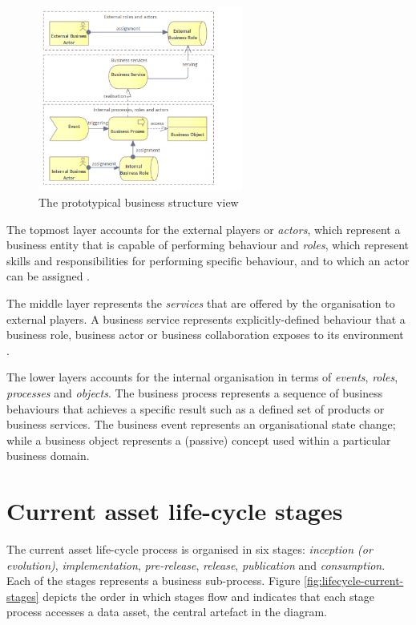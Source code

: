 	\begin{figure}[h]
		\centering
		\includegraphics[width=0.6\textwidth]{images/views/Business view.png}
		\caption{The prototypical business structure view}
		\label{fig:business-structure-protopypical}
	\end{figure} 
	
	The topmost layer accounts for the external players or \textit{actors}, which represent a business entity that is capable of performing behaviour and \textit{roles}, which represent skills and responsibilities for performing specific behaviour, and to which an actor can be assigned \citep{archimate3.1}. 
	
	The middle layer represents the \textit{services} that are offered by the organisation to external players. A business service represents explicitly-defined behaviour that a business role, business actor or business collaboration exposes to its environment \citep{archimate3.1}.
	
	The lower layers accounts for the internal organisation in terms of \textit{events}, \textit{roles}, \textit{processes} and \textit{objects}. The business process represents a sequence of business behaviours that achieves a specific result such as a defined set of products or business services. The business event represents an organisational state change; while a business object represents a (passive) concept used within a particular business domain.
	
	\section{Current asset life-cycle stages}
	\label{sec:lifecycle-current-stages}
	
	The current asset life-cycle process is organised in six stages: \textit{inception (or evolution)}, \textit{implementation}, \textit{pre-release}, \textit{release}, \textit{publication} and \textit{consumption}. Each of the stages represents a business sub-process. Figure \ref{fig:lifecycle-current-stages} depicts the order in which stages flow and indicates that each stage process accesses a data asset, the central artefact in the diagram.
	
